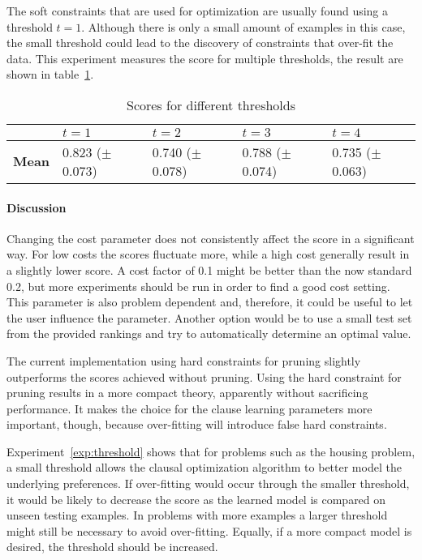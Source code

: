 \begin{experiment}
	\label{exp:threshold}
	The soft constraints that are used for optimization are usually found using a threshold $t = 1$.
	Although there is only a small amount of examples in this case, the small threshold could lead to the discovery of constraints that over-fit the data.
	This experiment measures the score for multiple thresholds, the result are shown in table~\ref{tbl:thresholds}.

	\begin{table}[!htp]
		\begin{tabularx}{\textwidth}{l|XXXX}
			& $t = 1$ & $t = 2$ & $t = 3$ & $t = 4$ \\
			\toprule
			\textbf{Mean} & 0.823 ($\pm$ 0.073) & 0.740 ($\pm$ 0.078) & 0.788 ($\pm$ 0.074) & 0.735 ($\pm$ 0.063)
		\end{tabularx}
		\caption{Scores for different thresholds}
		\label{tbl:thresholds}
	\end{table}
\end{experiment}

\paragraph{Discussion}
Changing the cost parameter does not consistently affect the score in a significant way.
For low costs the scores fluctuate more, while a high cost generally result in a slightly lower score.
A cost factor of 0.1 might be better than the now standard 0.2, but more experiments should be run in order to find a good cost setting.
This parameter is also problem dependent and, therefore, it could be useful to let the user influence the parameter.
Another option would be to use a small test set from the provided rankings and try to automatically determine an optimal value.

The current implementation using hard constraints for pruning slightly outperforms the scores achieved without pruning.
Using the hard constraint for pruning results in a more compact theory, apparently without sacrificing performance.
It makes the choice for the clause learning parameters more important, though, because over-fitting will introduce false hard constraints.

Experiment~\ref{exp:threshold} shows that for problems such as the housing problem, a small threshold allows the clausal optimization algorithm to better model the underlying preferences.
If over-fitting would occur through the smaller threshold, it would be likely to decrease the score as the learned model is compared on unseen testing examples.
In problems with more examples a larger threshold might still be necessary to avoid over-fitting.
Equally, if a more compact model is desired, the threshold should be increased.
